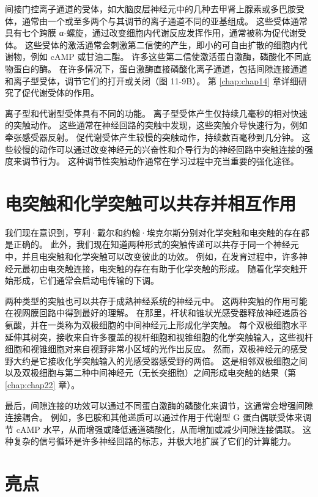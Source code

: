 间接门控离子通道的受体，如大脑皮层神经元中的几种去甲肾上腺素或多巴胺受体，通常由一个或至多两个与其调节的离子通道不同的亚基组成。 
这些受体通常具有七个跨膜 α-螺旋，通过改变细胞内代谢反应发挥作用，通常被称为促代谢受体。 
这些受体的激活通常会刺激第二信使的产生，即小的可自由扩散的细胞内代谢物，例如 cAMP 或甘油二酯。 
许多这些第二信使激活蛋白激酶，磷酸化不同底物蛋白的酶。 
在许多情况下，蛋白激酶直接磷酸化离子通道，包括间隙连接通道和离子型受体，调节它们的打开或关闭（图 11-9B）。 
第 \ref{chap:chap14} 章详细研究了促代谢受体的作用。


离子型和代谢型受体具有不同的功能。 
离子型受体产生仅持续几毫秒的相对快速的突触动作。 
这些通常在神经回路的突触中发现，这些突触介导快速行为，例如牵张感受器反射。 
促代谢受体产生较慢的突触动作，持续数百毫秒到几分钟。 
这些较慢的动作可以通过改变神经元的兴奋性和介导行为的神经回路中突触连接的强度来调节行为。 
这种调节性突触动作通常在学习过程中充当重要的强化途径。




\section{电突触和化学突触可以共存并相互作用}

我们现在意识到，亨利·戴尔和约翰·埃克尔斯分别对化学突触和电突触的存在都是正确的。 
此外，我们现在知道两种形式的突触传递可以共存于同一个神经元中，并且电突触和化学突触可以改变彼此的功效。 
例如，在发育过程中，许多神经元最初由电突触连接，电突触的存在有助于化学突触的形成。 
随着化学突触开始形成，它们通常会启动电传输的下调。


两种类型的突触也可以共存于成熟神经系统的神经元中。 
这两种突触的作用可能在视网膜回路中得到最好的理解。 在那里，杆状和锥状光感受器释放神经递质谷氨酸，并在一类称为双极细胞的中间神经元上形成化学突触。 
每个双极细胞水平延伸其树突，接收来自许多覆盖的视杆细胞和视锥细胞的化学突触输入，这些视杆细胞和视锥细胞对来自视野非常小区域的光作出反应。 
然而，双极神经元的感受野大约是它接收化学突触输入的光感受器感受野的两倍。 
这是相邻双极细胞之间以及双极细胞与第二种中间神经元（无长突细胞）之间形成电突触的结果（第 \ref{chap:chap22} 章）。


最后，间隙连接的功效可以通过不同蛋白激酶的磷酸化来调节，这通常会增强间隙连接耦合。 
例如，多巴胺和其他递质可以通过作用于代谢型 G 蛋白偶联受体来调节 cAMP 水平，从而增强或降低通道磷酸化，从而增加或减少间隙连接偶联。 
这种复杂的信号循环是许多神经回路的标志，并极大地扩展了它们的计算能力。


\section{亮点}

